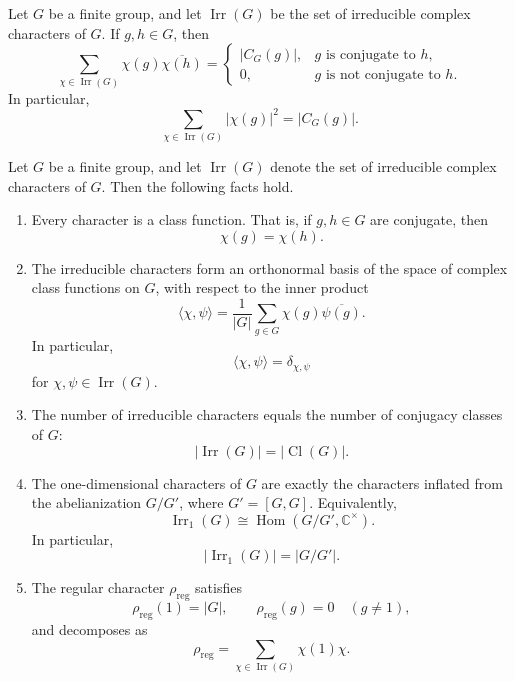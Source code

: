\begin{theorem}
\label{thm:column-orthogonality-irreducible-characters}
Let \(G\) be a finite group, and let \(\operatorname{Irr}(G)\) be the set of
irreducible complex characters of \(G\). If \(g,h\in G\), then
\[
\sum_{\chi\in\operatorname{Irr}(G)}
\chi(g)\overline{\chi(h)}
=
\begin{cases}
|C_G(g)|, & g \text{ is conjugate to } h,\\
0, & g \text{ is not conjugate to } h.
\end{cases}
\]
In particular,
\[
\sum_{\chi\in\operatorname{Irr}(G)}|\chi(g)|^2
=
|C_G(g)|.
\]
\end{theorem}



\begin{theorem}
\label{thm:basic-character-theory}
Let \(G\) be a finite group, and let \(\operatorname{Irr}(G)\) denote the set
of irreducible complex characters of \(G\). Then the following facts hold.

\begin{enumerate}
    \item[(i)] Every character is a class function. That is, if \(g,h\in G\)
    are conjugate, then
    \[
    \chi(g)=\chi(h).
    \]

    \item[(ii)] The irreducible characters form an orthonormal basis of the
    space of complex class functions on \(G\), with respect to the inner
    product
    \[
    \langle \chi,\psi\rangle
    =
    \frac{1}{|G|}\sum_{g\in G}\chi(g)\overline{\psi(g)}.
    \]
    In particular,
    \[
    \langle \chi,\psi\rangle=\delta_{\chi,\psi}
    \]
    for \(\chi,\psi\in \operatorname{Irr}(G)\).

    \item[(iii)] The number of irreducible characters equals the number of
    conjugacy classes of \(G\):
    \[
    |\operatorname{Irr}(G)|
    =
    |\operatorname{Cl}(G)|.
    \]

    \item[(iv)] The one-dimensional characters of \(G\) are exactly the
    characters inflated from the abelianization \(G/G'\), where
    \(G'=[G,G]\). Equivalently,
    \[
    \operatorname{Irr}_1(G)
    \cong
    \operatorname{Hom}(G/G',\mathbb C^\times).
    \]
    In particular,
    \[
    |\operatorname{Irr}_1(G)|=|G/G'|.
    \]

    \item[(v)] The regular character \(\rho_{\mathrm{reg}}\) satisfies
    \[
    \rho_{\mathrm{reg}}(1)=|G|,
    \qquad
    \rho_{\mathrm{reg}}(g)=0
    \quad (g\neq 1),
    \]
    and decomposes as
    \[
    \rho_{\mathrm{reg}}
    =
    \sum_{\chi\in\operatorname{Irr}(G)}\chi(1)\chi.
    \]


\end{enumerate}
\end{theorem}
